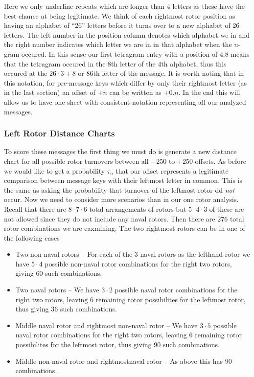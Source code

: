 \noindent Here we only underline repeats which are longer than $4$ letters as these have the best chance at being legitimate. We think of each rightmost rotor position as having an alphabet of ``26'' letters before it turns over to a new alphabet of 26 letters. The left number in the position column denotes which alphabet we in and the right number indicates which letter we are in in that alphabet when the $n$-gram occured. In this sense our first tetragram entry with a position of $4.8$ means that the tetragram occured in the $8$th letter of the $4$th alphabet, thus this occured at the $26\cdot3 + 8$ or $86$th letter of the message. It is worth noting that in this notation, for pre-message keys which differ by only their rightmost letter (as in the last section) an offset of $+n$ can be written as $+0.n$. In the end this will allow us to have one sheet with consistent notation representing all our analyzed messages.

\subsubsection{Left Rotor Distance Charts}
To score these messages the first thing we must do is generate a new distance chart for all possible rotor turnovers between all $-250$ to $+250$ offsets. As before we would like to get a probability $\tau_n$ that our offset represents a legitimate comparison between message keys with their leftmost letter in common. This is the same as asking the probability that turnover of the leftmost rotor dd \emph{not} occur. Now we need to consider more scenarios than in our one rotor analysis. Recall that there are $8\cdot7\cdot6$ total arrangements of rotors but $5\cdot4\cdot3$ of these are not allowed since they do not include any naval rotors. Then there are $276$ total rotor combinations we are eaxmining. The two rightmost rotors can be in one of the following cases
\begin{itemize}
	\item Two non-naval rotors -- For each of the $3$ naval rotors as the lefthand rotor we have $5\cdot4$ possible non-naval rotor combinations for the right two rotors, giving $60$ such combinations.
	\item Two naval rotors --  We have $3\cdot2$ possible naval rotor combinations for the right two rotors, leaving $6$ remaining rotor possibilites for the leftmost rotor, thus giving $36$ such combinations.
	\item Middle naval rotor and rightmost non-naval rotor --  We have $3\cdot5$ possible naval rotor combinations for the right two rotors, leaving $6$ remaining rotor possibilites for the leftmost rotor, thus giving $90$ such combinations.
	\item Middle non-naval rotor and rightmostnaval rotor --  As above this has $90$ combinations.
\end{itemize}

